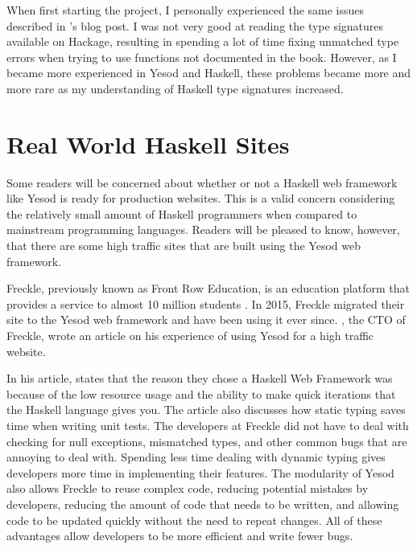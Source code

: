 When first starting the project, I personally experienced the same issues described
in \citeauthor{beginnerYesod}'s blog post. I was not very good at reading the type
signatures available on Hackage, resulting in spending a lot of time fixing
unmatched type errors when trying to use functions not documented in the book.
However, as I became more experienced in Yesod and Haskell, these problems
became more and more rare as my understanding of Haskell type signatures increased.

\section{Real World Haskell Sites}

Some readers will be concerned about whether or not a Haskell web framework like
Yesod is ready for production websites. This is a valid concern considering the
relatively small amount of Haskell programmers when compared to mainstream 
programming languages. Readers will be pleased to know, however, that there
are some high traffic sites that are built using the Yesod web framework.

Freckle, previously known as Front Row Education, is an education
platform that provides a service to almost 10 million students \parencite{frontrowName}. 
In 2015, Freckle migrated their site to the Yesod web framework and have been 
using it ever since. \citeauthor{frontrow}, the CTO of Freckle, wrote an article
on his experience of using Yesod for a high traffic website. \parencite{frontrow}

In his article, \citeauthor{frontrow} states that the reason they chose a Haskell
Web Framework was because of the low resource usage and the ability to make
quick iterations that the Haskell language gives you. The article also discusses
how static typing saves time when writing unit tests. The developers at Freckle
did not have to deal with checking for null exceptions, mismatched types, and
other common bugs that are annoying to deal with. Spending less time dealing with
dynamic typing gives developers more time in implementing their features. The
modularity of Yesod also allows Freckle to reuse complex code, reducing potential
mistakes by developers, reducing the amount of code that needs to be written,
and allowing code to be updated quickly without the need to repeat changes. All
of these advantages allow developers to be more efficient and write fewer bugs. \parencite{frontrow}

